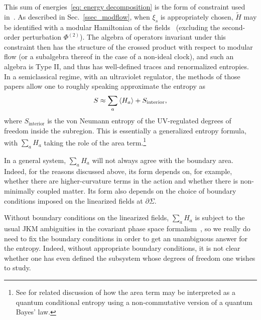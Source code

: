 \documentclass[]{jkpaper}
\theoremstyle{plain}
\theoremstyle{definition}
\begin{document}
This sum of energies~\eqref{eq: energy decomposition} is the form of constraint used in~\cite{Chandrasekaran:2022cip,Jensen:2023yxy,Kudler-Flam:2023hkl,Kudler-Flam:2023qfl,Kudler-Flam:2024psh,DeVuyst:2024pop,DVEHK,Faulkner:2024gst,Aguilar-Gutierrez:2023odp,Chen:2024rpx,Gomez:2023upk,Gomez:2023wrq,Fewster:2024pur,Kolchmeyer:2024fly}. As described in Sec.~\ref{ssec_modflow}, when $\xi_s$ is appropriately chosen, $\tilde{H}$ may be identified with a modular Hamiltonian of the fields~\cite{Sewell:1982zz} (excluding the second-order perturbation $\Phi^{(2)}$). The algebra of operators invariant under this constraint then has the structure of the crossed product with respect to modular flow (or a subalgebra thereof in the case of a non-ideal clock), and such an algebra is Type II, and thus has well-defined traces and renormalized entropies. In a semiclassical regime, with an ultraviolet regulator, the methods of those papers allow one to roughly speaking approximate the entropy as
\begin{equation}
    S \approx \sum_a\expval{H_a} + S_{\text{interior}},
\end{equation}
where $S_{\text{interior}}$ is the von Neumann entropy of the UV-regulated degrees of freedom inside the subregion. This is essentially a generalized entropy formula, with $\sum_a H_a$ taking the role of the area term.\footnote{See \cite{AliAhmad:2024saq} for related discussion of how the area term may be interpreted as a quantum conditional entropy using a non-commutative version of a quantum Bayes' law.}

In a general system, $\sum_a H_a$ will not always agree with the boundary area. Indeed, for the reasons discussed above, its form depends on, for example, whether there are higher-curvature terms in the action and whether there is non-minimally coupled matter. Its form also depends on the choice of boundary conditions imposed on the linearized fields at $\partial\Sigma$. 

Without boundary conditions on the linearized fields, $\sum_a H_a$ is subject to the usual JKM ambiguities in the covariant phase space formalism~\cite{Iyer:1994ys,Jacobson:1993vj}, so we really do need to fix the boundary conditions in order to get an unambiguous answer for the entropy. Indeed, without appropriate boundary conditions, it is not clear whether one has even defined the subsystem whose degrees of freedom one wishes to study.
\end{document}
